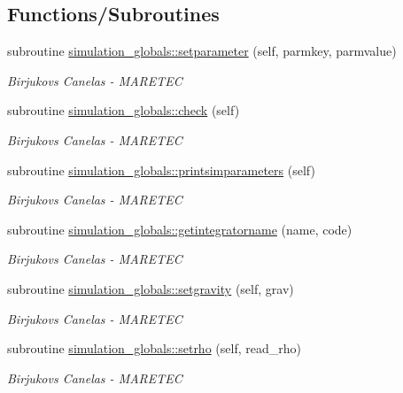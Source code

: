 \subsection*{Functions/\+Subroutines}
\begin{DoxyCompactItemize}
\item 
subroutine \hyperlink{namespacesimulation__globals_aed3f671899558008ae9f0f009f581baf}{simulation\+\_\+globals\+::setparameter} (self, parmkey, parmvalue)
\begin{DoxyCompactList}\small\item\em Birjukovs Canelas -\/ M\+A\+R\+E\+T\+EC \end{DoxyCompactList}\item 
subroutine \hyperlink{namespacesimulation__globals_a3867df0f77dca3700c9470aea24fd048}{simulation\+\_\+globals\+::check} (self)
\begin{DoxyCompactList}\small\item\em Birjukovs Canelas -\/ M\+A\+R\+E\+T\+EC \end{DoxyCompactList}\item 
subroutine \hyperlink{namespacesimulation__globals_a0b17b2f2e9e7dbbad7c9d735217c1ee1}{simulation\+\_\+globals\+::printsimparameters} (self)
\begin{DoxyCompactList}\small\item\em Birjukovs Canelas -\/ M\+A\+R\+E\+T\+EC \end{DoxyCompactList}\item 
subroutine \hyperlink{namespacesimulation__globals_a2c6bf88542c503d1da58280ab3dcf772}{simulation\+\_\+globals\+::getintegratorname} (name, code)
\begin{DoxyCompactList}\small\item\em Birjukovs Canelas -\/ M\+A\+R\+E\+T\+EC \end{DoxyCompactList}\item 
subroutine \hyperlink{namespacesimulation__globals_ac655f60155581a71b312f3c1a8c87db2}{simulation\+\_\+globals\+::setgravity} (self, grav)
\begin{DoxyCompactList}\small\item\em Birjukovs Canelas -\/ M\+A\+R\+E\+T\+EC \end{DoxyCompactList}\item 
subroutine \hyperlink{namespacesimulation__globals_acfdc640757f0275bccb1d8de7bd7dc92}{simulation\+\_\+globals\+::setrho} (self, read\+\_\+rho)
\begin{DoxyCompactList}\small\item\em Birjukovs Canelas -\/ M\+A\+R\+E\+T\+EC \end{DoxyCompactList}\item 

\end{DoxyCompactItemize}

